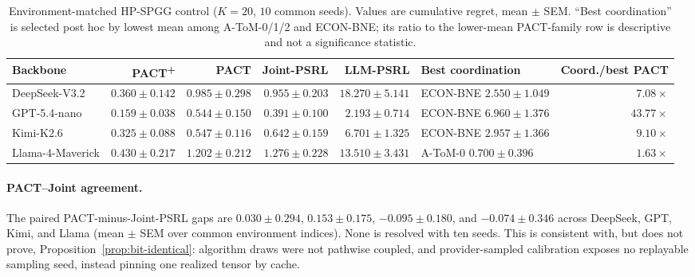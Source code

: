 \begin{table}[t]
\centering\scriptsize
\caption{Environment-matched HP-SPGG control ($K{=}20$, $10$ common seeds). Values are cumulative regret, mean $\pm$ SEM. ``Best coordination'' is selected post hoc by lowest mean among A-ToM-0/1/2 and ECON-BNE; its ratio to the lower-mean PACT-family row is descriptive and not a significance statistic.}
\label{tab:hp-spgg-matched}
\setlength{\tabcolsep}{3pt}
\begin{tabular}{lrrrrlr}
\toprule
Backbone & PACT\textsuperscript{+} & PACT & Joint-PSRL & LLM-PSRL & Best coordination & Coord./best PACT \\
\midrule
DeepSeek-V3.2 & $0.360\pm0.142$ & $0.985\pm0.298$ & $0.955\pm0.203$ & $18.270\pm5.141$ & ECON-BNE $2.550\pm1.049$ & $7.08\times$ \\
GPT-5.4-nano & $0.159\pm0.038$ & $0.544\pm0.150$ & $0.391\pm0.100$ & $2.193\pm0.714$ & ECON-BNE $6.960\pm1.376$ & $43.77\times$ \\
Kimi-K2.6 & $0.325\pm0.088$ & $0.547\pm0.116$ & $0.642\pm0.159$ & $6.701\pm1.325$ & ECON-BNE $2.957\pm1.366$ & $9.10\times$ \\
Llama-4-Maverick & $0.430\pm0.217$ & $1.202\pm0.212$ & $1.276\pm0.228$ & $13.510\pm3.431$ & A-ToM-0 $0.700\pm0.396$ & $1.63\times$ \\
\bottomrule
\end{tabular}
\end{table}

\paragraph{PACT--Joint agreement.}
The paired PACT-minus-Joint-PSRL gaps are $0.030\pm0.294$, $0.153\pm0.175$, $-0.095\pm0.180$, and $-0.074\pm0.346$ across DeepSeek, GPT, Kimi, and Llama (mean $\pm$ SEM over common environment indices). None is resolved with ten seeds. This is consistent with, but does not prove, Proposition~\ref{prop:bit-identical}: algorithm draws were not pathwise coupled, and provider-sampled calibration exposes no replayable sampling seed, instead pinning one realized tensor by cache.

